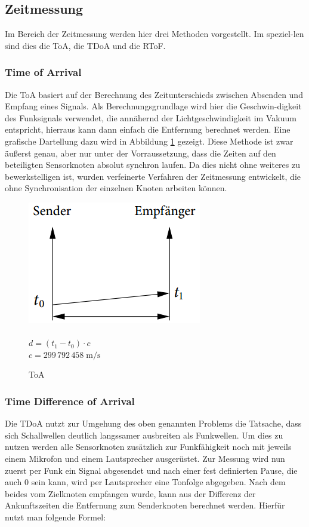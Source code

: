 \subsection{Zeitmessung}
Im Bereich der Zeitmessung werden hier drei Methoden vorgestellt. Im speziel-len sind dies die \ac{ToA}, die \ac{TDoA} und die \ac{RToF}.
\subsubsection{Time of Arrival}
Die \ac{ToA} basiert auf der Berechnung des Zeitunterschieds zwischen Absenden und Empfang eines Signals. Als Berechnungsgrundlage wird hier
die Geschwin-digkeit des Funksignals verwendet, die annähernd der Lichtgeschwindigkeit im Vakuum entspricht, hierraus kann dann einfach die 
Entfernung berechnet werden. Eine grafische Dartellung dazu wird in Abbildung \ref{fig:ToA} gezeigt. Diese Methode ist zwar äußerst genau, aber nur unter der Vorraussetzung, dass die Zeiten auf den beteiligten Sensorknoten absolut synchron laufen. Da dies nicht ohne weiteres zu bewerkstelligen ist, wurden verfeinerte Verfahren der Zeitmessung entwickelt, die ohne Synchronisation der einzelnen Knoten arbeiten können. 

\begin{figure}[h!]    
  \centering
  \includegraphics[scale=0.5]{img/time1}\\~\\
  \label{fig:ToA}
  $d = (t_{1} - t_{0}) \cdot c$\\
  $c=299\,792\,458\;\mathrm{m/s}$
  \caption{ToA}
\end{figure}

\subsubsection{Time Difference of Arrival}
Die \ac{TDoA} nutzt zur Umgehung des oben genannten Problems die
Tatsache, dass sich Schallwellen deutlich langssamer ausbreiten als
Funkwellen. Um dies zu nutzen werden alle Sensorknoten zusätzlich zur
Funkfähigkeit noch mit jeweils einem Mikrofon und einem Lautsprecher
ausgerüstet. Zur Messung wird nun zuerst per Funk ein Signal
abgesendet und nach einer fest definierten Pause, die auch 0 sein
kann, wird per Lautsprecher eine Tonfolge abgegeben. Nach dem beides
vom Zielknoten empfangen wurde, kann aus der Differenz der
Ankunftszeiten die Entfernung zum Senderknoten berechnet werden.
Hierfür nutzt man folgende Formel:

